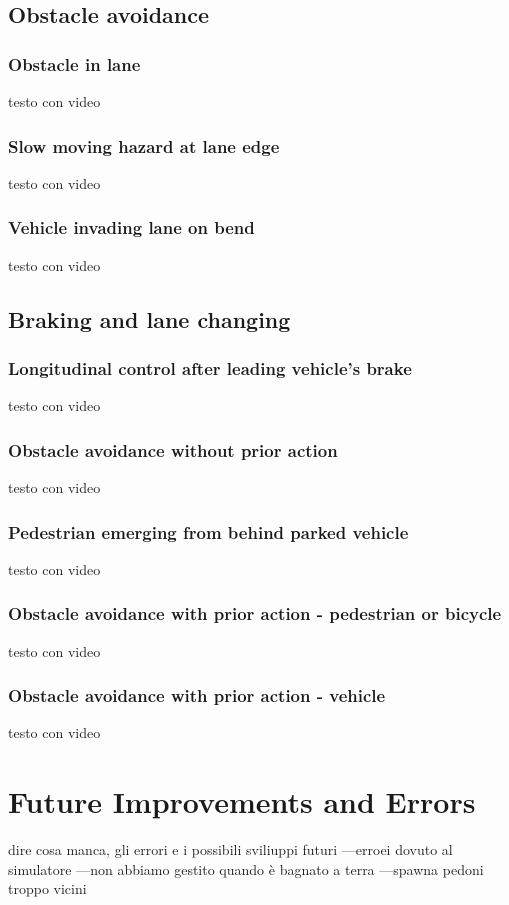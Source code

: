 \documentclass{article}
\begin{document}
\subsection{Obstacle avoidance}
\subsubsection{Obstacle in lane}
testo con video
\subsubsection{Slow moving hazard at lane edge}
testo con video 
\subsubsection{Vehicle invading lane on bend}
testo con video

\subsection{Braking and lane changing}
\subsubsection{Longitudinal control after leading vehicle’s brake}
testo con video
\subsubsection{Obstacle avoidance without prior action}
testo con video
\subsubsection{Pedestrian emerging from behind parked vehicle}
testo con video
\subsubsection{Obstacle avoidance with prior action - pedestrian or bicycle}
testo con video
\subsubsection{Obstacle avoidance with prior action - vehicle}
testo con video

\section{Future Improvements and Errors}
dire cosa manca, gli errori e i possibili sviliuppi futuri
---erroei dovuto al simulatore
---non abbiamo gestito quando è bagnato a terra
---spawna pedoni troppo vicini
\end{document}
